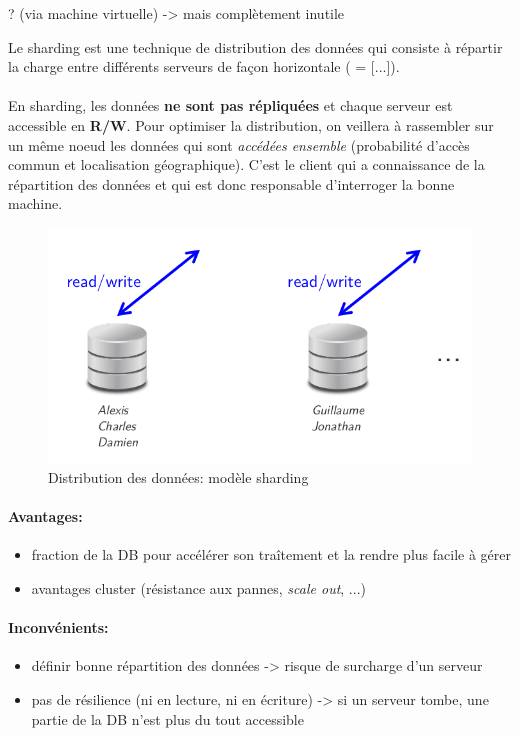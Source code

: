 \item{}
{\vrai ? (via machine virtuelle) -> mais complètement inutile}
{Le sharding est une technique de distribution des données qui consiste à répartir la charge entre différents serveurs de façon horizontale ( = [...]).
\paragraph{}
En sharding, les données \textbf{ne sont pas répliquées} et chaque serveur est accessible en \textbf{R/W}. Pour optimiser la distribution, on veillera à rassembler sur un même noeud les données qui sont \textit{accédées ensemble} (probabilité d'accès commun et localisation géographique). C'est le client qui a connaissance de la répartition des données et qui est donc responsable d'interroger la bonne machine.
\begin{figure}[!h]
\center\includegraphics[scale=.3]{images/sharding}
\caption{Distribution des données: modèle sharding \cite{ref1}}
\end{figure}

\paragraph{Avantages:}
\begin{itemize}\setlength{\itemsep}{.2em}
\item[\textcolor{dkgreen}{\ding{52}}]fraction de la DB pour accélérer son traîtement et la rendre plus facile à gérer
\item[\textcolor{dkgreen}{\ding{52}}]avantages cluster (résistance aux pannes, \textit{scale out}, ...)
\end{itemize}

\paragraph{Inconvénients:}
\begin{itemize}\setlength{\itemsep}{.2em}
\item[\textcolor{dkred}{\ding{56}}]définir bonne répartition des données -> risque de surcharge d'un serveur
\item[\textcolor{dkred}{\ding{56}}]pas de résilience (ni en lecture, ni en écriture) -> si un serveur tombe, une partie de la DB n'est plus du tout accessible
\end{itemize}

}


